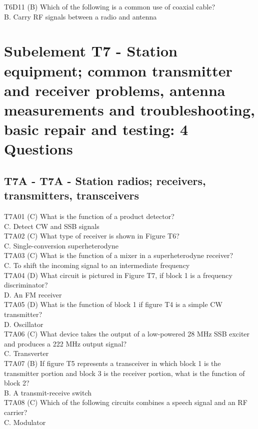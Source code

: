 \documentclass[12pt,letterpaper]{report}
\begin{document}
T6D11 (B) Which of the following is a common use of coaxial cable?\\
B. Carry RF signals between a radio and antenna\\

\chapter{Subelement T7 - Station equipment; common transmitter and receiver problems, antenna measurements and troubleshooting, basic repair and testing: 4 Questions}

\section{T7A - T7A - Station radios; receivers, transmitters, transceivers}

T7A01 (C) What is the function of a product detector?\\
C. Detect CW and SSB signals\\

T7A02 (C) What type of receiver is shown in Figure T6?\\
C. Single-conversion superheterodyne\\

T7A03 (C) What is the function of a mixer in a superheterodyne receiver?\\
C. To shift the incoming signal to an intermediate frequency\\

T7A04 (D) What circuit is pictured in Figure T7, if block 1 is a frequency discriminator?\\
D. An FM receiver\\

T7A05 (D) What is the function of block 1 if figure T4 is a simple CW transmitter?\\
D. Oscillator\\

T7A06 (C) What device takes the output of a low-powered 28 MHz SSB exciter and produces a 222 MHz output signal?\\
C. Transverter\\

T7A07 (B) If figure T5 represents a transceiver in which block 1 is the transmitter portion and block 3 is the receiver portion, what is the function of block 2?\\
B. A transmit-receive switch\\

T7A08 (C) Which of the following circuits combines a speech signal and an RF carrier?\\
C. Modulator\\
\end{document}
